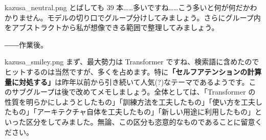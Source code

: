 \documentclass[b5paper,xelatex,ja=standard,10pt]{bxjsarticle}
\begin{document}
\begin{SERIFU}[colback=PaleIris, colbacktitle=PaleIris2]{kazusa_neutral.png}
とばしても 39 本……多いですね……こう多いと何が何だかわかりません。モデルの切り口でグループ分けしてみましょう。さらにグループ内をアブストラクトから私が想像できる範囲で整理してみましょう。
\end{SERIFU}
\vspace{1pt}
\centerline{――作業後。}

\begin{SERIFU}[colback=PaleIris, colbacktitle=PaleIris2]{kazusa_smiley.png}
まず、最大勢力は Transformer ですね、検索語に含めたのでヒットするのは当然ですが、多くを占めます。特に\textbf{「セルフアテンションの計算量に対処する」}は昨年以前から引き続いて人気(?)なテーマであるようです。このサブグループは後で改めてメモしましょう。全体としては、「Transformer の性質を明らかにしようとしたもの」「訓練方法を工夫したもの」「使い方を工夫したもの」「アーキテクチャ自体を工夫したもの」「新しい用途に利用したもの」といった区分をしてみました。無論、この区分も恣意的なものであることに留意ください。
\end{SERIFU}
\end{document}
